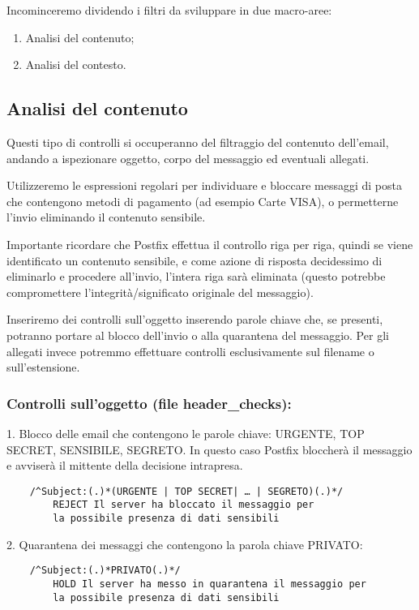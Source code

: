    Incominceremo dividendo i filtri da sviluppare in due macro-aree:

    \begin{enumerate}
        \item Analisi del contenuto;
        \item Analisi del contesto.
    \end{enumerate}

    \subsection{Analisi del contenuto}
    Questi tipo di controlli si occuperanno del filtraggio del contenuto dell'email, 
    andando a ispezionare oggetto, corpo del messaggio ed eventuali allegati. 
    
    Utilizzeremo le espressioni regolari per individuare e bloccare messaggi di posta che contengono metodi di 
    pagamento (ad esempio Carte VISA), o permetterne l’invio eliminando il contenuto sensibile. 
    
    Importante ricordare che Postfix effettua il controllo riga per riga, quindi se viene identificato un 
    contenuto sensibile, e come azione di risposta decidessimo di eliminarlo e procedere all’invio, 
    l’intera riga sarà eliminata (questo potrebbe compromettere l’integrità/significato originale del messaggio). 
    
    Inseriremo dei controlli sull’oggetto inserendo parole chiave che, se presenti, 
    potranno portare al blocco dell’invio o alla quarantena del messaggio. Per gli allegati invece potremmo 
    effettuare controlli esclusivamente sul filename o sull’estensione. 

    \subsubsection{Controlli sull'oggetto (file header\_checks):}

    1. Blocco delle email che contengono le parole chiave: URGENTE, TOP SECRET, SENSIBILE, SEGRETO.
    In questo caso Postfix bloccherà il messaggio e avviserà il mittente della decisione intrapresa.

    \begin{verbatim}
    /^Subject:(.)*(URGENTE | TOP SECRET| … | SEGRETO)(.)*/
        REJECT Il server ha bloccato il messaggio per 
        la possibile presenza di dati sensibili
    \end{verbatim}

    2. Quarantena dei messaggi che contengono la parola chiave PRIVATO:
    \begin{verbatim}
    /^Subject:(.)*PRIVATO(.)*/
        HOLD Il server ha messo in quarantena il messaggio per 
        la possibile presenza di dati sensibili
    \end{verbatim}

